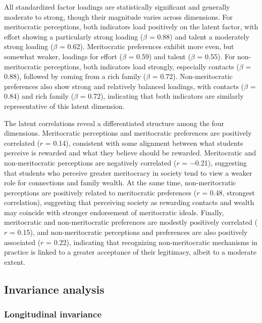 \documentclass[
  13pt,
]{article}
\begin{document}
All standardized factor loadings are statistically significant and
generally moderate to strong, though their magnitude varies across
dimensions. For meritocratic perceptions, both indicators load
positively on the latent factor, with effort showing a particularly
strong loading (\(\beta\) = 0.88) and talent a moderately strong loading
(\(\beta\) = 0.62). Meritocratic preferences exhibit more even, but
somewhat weaker, loadings for effort (\(\beta\) = 0.59) and talent
(\(\beta\) = 0.55). For non-meritocratic perceptions, both indicators
load strongly, especially contacts (\(\beta\) = 0.88), followed by
coming from a rich family (\(\beta\) = 0.72). Non-meritocratic
preferences also show strong and relatively balanced loadings, with
contacts (\(\beta\) = 0.84) and rich family (\(\beta\) = 0.72),
indicating that both indicators are similarly representative of this
latent dimension.

The latent correlations reveal a differentiated structure among the four
dimensions. Meritocratic perceptions and meritocratic preferences are
positively correlated (\(r\) = 0.14), consistent with some alignment
between what students perceive is rewarded and what they believe should
be rewarded. Meritocratic and non-meritocratic perceptions are
negatively correlated (\(r\) = −0.21), suggesting that students who
perceive greater meritocracy in society tend to view a weaker role for
connections and family wealth. At the same time, non-meritocratic
perceptions are positively related to meritocratic preferences (\(r\) =
0.48, strongest correlation), suggesting that perceiving society as
rewarding contacts and wealth may coincide with stronger endorsement of
meritocratic ideals. Finally, meritocratic and non-meritocratic
preferences are modestly positively correlated (\(r\) = 0.15), and
non-meritocratic perceptions and preferences are also positively
associated (\(r\) = 0.22), indicating that recognizing non-meritocratic
mechanisms in practice is linked to a greater acceptance of their
legitimacy, albeit to a moderate extent.

\subsection{Invariance analysis}\label{invariance-analysis}

\subsubsection{Longitudinal invariance}\label{longitudinal-invariance}
\end{document}
